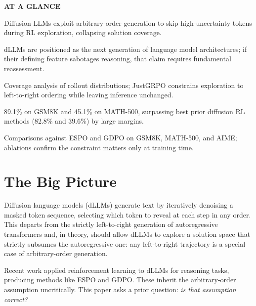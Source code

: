 \documentclass[10pt,twocolumn]{article}
\begin{document}
\begin{mdframed}[backgroundcolor=boxgray,linecolor=rulered,linewidth=1pt,
    innerleftmargin=6pt,innerrightmargin=6pt,
    innertopmargin=6pt,innerbottommargin=6pt]
\textbf{\small AT A GLANCE}\par\vspace{4pt}
\begin{description}[leftmargin=0pt,labelsep=4pt,itemsep=2pt,parsep=0pt,
    font=\small\bfseries]
  \item[Problem:] Diffusion LLMs exploit arbitrary-order generation to skip
    high-uncertainty tokens during RL exploration, collapsing solution coverage.
  \item[Why it matters:] dLLMs are positioned as the next generation of
    language model architectures; if their defining feature sabotages reasoning,
    that claim requires fundamental reassessment.
  \item[Method:] Coverage analysis of rollout distributions; JustGRPO constrains
    exploration to left-to-right ordering while leaving inference unchanged.
  \item[Result:] 89.1\% on GSM8K and 45.1\% on MATH-500, surpassing best
    prior diffusion RL methods (82.8\% and 39.6\%) by large margins.
  \item[Evidence:] Comparisons against ESPO and GDPO on GSM8K, MATH-500, and
    AIME; ablations confirm the constraint matters only at training time.
\end{description}
\end{mdframed}

\section{The Big Picture}

Diffusion language models (dLLMs) generate text by iteratively denoising a
masked token sequence, selecting which token to reveal at each step in any
order. This departs from the strictly left-to-right generation of autoregressive
transformers and, in theory, should allow dLLMs to explore a solution space that
strictly subsumes the autoregressive one: any left-to-right trajectory is a
special case of arbitrary-order generation.

Recent work applied reinforcement learning to dLLMs for reasoning tasks,
producing methods like ESPO and GDPO. These inherit the arbitrary-order
assumption uncritically. This paper asks a prior question: \emph{is that
assumption correct?}
\end{document}
